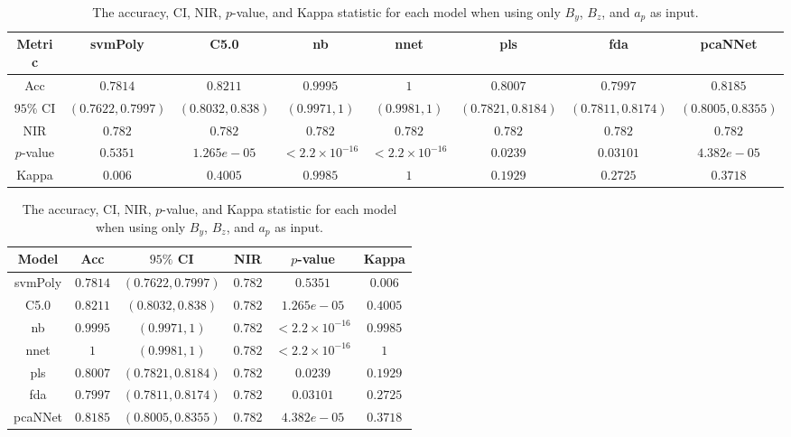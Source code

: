 \begin{table}[!ht]
	\centering
	\begin{tabular}{|c|c|c|c|c|c|c|c|}
		\hline
		Metric & svmPoly & C5.0 & nb & nnet & pls & fda & pcaNNet \\ \hline
		Acc & $0.7814$ & $0.8211$ & $0.9995$ & $1$ & $0.8007$ & $0.7997$ & $0.8185$ \\ \hline
		$95\%$ CI & $(0.7622, 0.7997)$ & $(0.8032, 0.838)$ & $(0.9971, 1)$ & $(0.9981, 1)$ & $(0.7821, 0.8184)$ & $(0.7811, 0.8174)$ & $(0.8005, 0.8355)$ \\ \hline
		NIR & $0.782$ & $0.782$ & $0.782$ & $0.782$ & $0.782$ & $0.782$ & $0.782$ \\ \hline
		$p$-value & $0.5351$ & $1.265e-05$ & $< 2.2 \times {10}^{-16}$ & $< 2.2 \times {10}^{-16}$ & $0.0239$ & $0.03101$ & $4.382e-05$ \\ \hline
		Kappa & $0.006$ & $0.4005$ & $0.9985$ & $1$ & $0.1929$ & $0.2725$ & $0.3718$ \\ \hline
	\end{tabular}
	\caption{The accuracy, CI, NIR, $p$-value, and Kappa statistic for each model when using only $B_{y}$, $B_{z}$, and $a_{p}$ as input.}
	\label{tab:stats:yzap}
\end{table}

\begin{table}[!ht]
	\centering
	\begin{tabular}{|c|c|c|c|c|c|}
		\hline
		Model & Acc & $95\%$ CI & NIR & $p$-value & Kappa \\ \hline
		svmPoly & $0.7814$ & $(0.7622, 0.7997)$ & $0.782$ & $0.5351$ & $0.006$ \\ \hline
		C5.0 & $0.8211$ & $(0.8032, 0.838)$ & $0.782$ & $1.265e-05$ & $0.4005$ \\ \hline
		nb & $0.9995$ & $(0.9971, 1)$ & $0.782$ & $< 2.2 \times {10}^{-16}$ & $0.9985$ \\ \hline
		nnet & $1$ & $(0.9981, 1)$ & $0.782$ & $< 2.2 \times {10}^{-16}$ & $1$ \\ \hline
		pls & $0.8007$ & $(0.7821, 0.8184)$ & $0.782$ & $0.0239$ & $0.1929$ \\ \hline
		fda & $0.7997$ & $(0.7811, 0.8174)$ & $0.782$ & $0.03101$ & $0.2725$ \\ \hline
		pcaNNet & $0.8185$ & $(0.8005, 0.8355)$ & $0.782$ & $4.382e-05$ & $0.3718$ \\ \hline
	\end{tabular}
	\caption{The accuracy, CI, NIR, $p$-value, and Kappa statistic for each model when using only $B_{y}$, $B_{z}$, and $a_{p}$ as input.}
	\label{tab:stats:reverse:yzap}
\end{table}

